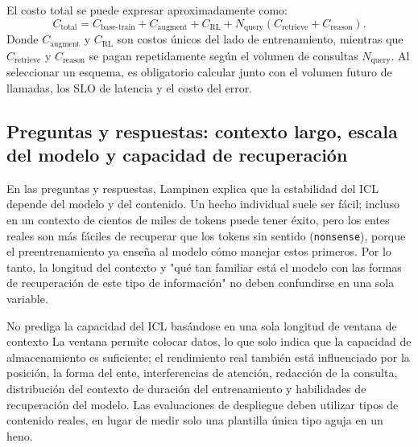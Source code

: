 El costo total se puede expresar aproximadamente como:
$$
C_{\text{total}}=
C_{\text{base-train}}+C_{\text{augment}}+C_{\text{RL}}
+N_{\text{query}}\left(C_{\text{retrieve}}+C_{\text{reason}}\right).
$$
Donde $C_{\text{augment}}$ y $C_{\text{RL}}$ son costos únicos del lado de entrenamiento, mientras que $C_{\text{retrieve}}$ y $C_{\text{reason}}$ se pagan repetidamente según el volumen de consultas $N_{\text{query}}$. Al seleccionar un esquema, es obligatorio calcular junto con el volumen futuro de llamadas, los SLO de latencia y el costo del error.

\subsection{Preguntas y respuestas: contexto largo, escala del modelo y capacidad de recuperación}

En las preguntas y respuestas, Lampinen explica que la estabilidad del ICL depende del modelo y del contenido. Un hecho individual suele ser fácil; incluso en un contexto de cientos de miles de tokens puede tener éxito, pero los entes reales son más fáciles de recuperar que los tokens sin sentido (\texttt{nonsense}), porque el preentrenamiento ya enseña al modelo cómo manejar estos primeros. Por lo tanto, la longitud del contexto y "qué tan familiar está el modelo con las formas de recuperación de este tipo de información" no deben confundirse en una sola variable.


\begin{warningbox}{No prediga la capacidad del ICL basándose en una sola longitud de ventana de contexto}
La ventana permite colocar datos, lo que solo indica que la capacidad de almacenamiento es suficiente; el rendimiento real también está influenciado por la posición, la forma del ente, interferencias de atención, redacción de la consulta, distribución del contexto de duración del entrenamiento y habilidades de recuperación del modelo. Las evaluaciones de despliegue deben utilizar tipos de contenido reales, en lugar de medir solo una plantilla única tipo aguja en un heno.
\end{warningbox}

